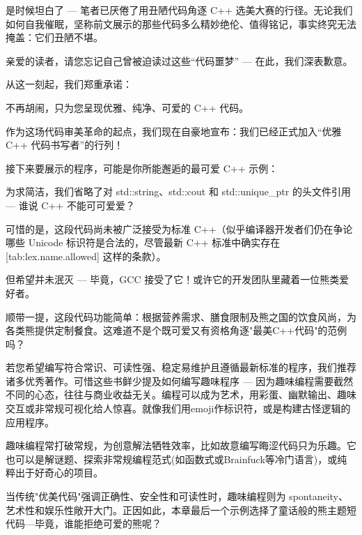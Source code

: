 
是时候坦白了 --- 笔者已厌倦了用丑陋代码角逐 C++ 选美大赛的行径。无论我们如何自我催眠，坚称前文展示的那些代码多么精妙绝伦、值得铭记，事实终究无法掩盖：它们丑陋不堪。

亲爱的读者，请您忘记自己曾被迫读过这些“代码噩梦” --- 在此，我们深表歉意。

从这一刻起，我们郑重承诺：

不再胡闹，只为您呈现优雅、纯净、可爱的 C++ 代码。

作为这场代码审美革命的起点，我们现在自豪地宣布：我们已经正式加入“优雅 C++ 代码书写者”的行列！

接下来要展示的程序，可能是你所能邂逅的最可爱 C++ 示例：


为求简洁，我们省略了对 std::string、std::cout 和 std::unique\_ptr 的头文件引用 --- 谁说 C++ 不能可可爱爱？

可惜的是，这段代码尚未被广泛接受为标准 C++（似乎编译器开发者们仍在争论哪些 Unicode 标识符是合法的，尽管最新 C++ 标准中确实存在 [tab:lex.name.allowed] 这样的条款）。

但希望并未泯灭 --- 毕竟，GCC 接受了它！或许它的开发团队里藏着一位熊类爱好者。

顺带一提，这段代码功能简单：根据营养需求、膳食限制及熊之国的饮食风尚，为各类熊提供定制餐食。这难道不是个既可爱又有资格角逐"最美C++代码"的范例吗？

若您希望编写符合常识、可读性强、稳定易维护且遵循最新标准的程序，我们推荐诸多优秀著作。可惜这些书鲜少提及如何编写趣味程序 --- 因为趣味编程需要截然不同的心态，往往与商业收益无关。编程可以成为艺术，用彩蛋、幽默输出、趣味交互或非常规可视化给人惊喜。就像我们用emoji作标识符，或是构建古怪逻辑的应用程序。

趣味编程常打破常规，为创意解法牺牲效率，比如故意编写晦涩代码只为乐趣。它也可以是解谜题、探索非常规编程范式(如函数式或Brainfuck等冷门语言)，或纯粹出于好奇心的项目。

当传统"优美代码"强调正确性、安全性和可读性时，趣味编程则为 spontaneity、艺术性和娱乐性敞开大门。正因如此，本章最后一个示例选择了童话般的熊主题短代码---毕竟，谁能拒绝可爱的熊呢？